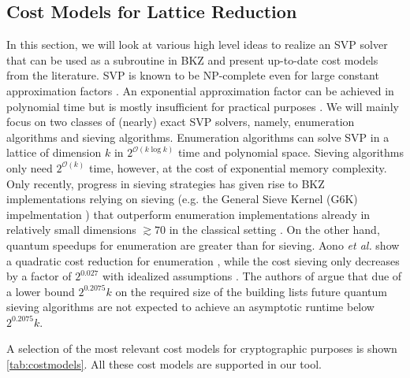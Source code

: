 




\subsection{Cost Models for Lattice Reduction} \label{sec:costmodels}
In this section, we will look at various high level ideas to realize an SVP solver that can be used as a subroutine in BKZ and present up-to-date cost models from the literature. SVP is known to be NP-complete even for large constant approximation factors \cite{Ajt98, Khot05}. An exponential approximation factor can be achieved in polynomial time but is mostly insufficient for practical purposes \cite{LLL82}.  We will mainly focus on two classes of (nearly) exact SVP solvers, namely, enumeration algorithms and sieving algorithms. Enumeration algorithms can solve SVP in a lattice of dimension $k$ in $2^{\mathcal{O}(k \log k)}$ time and polynomial space. Sieving algorithms only need $2^{\mathcal{O}(k)}$ time, however, at the cost of exponential memory complexity. Only recently, progress in sieving strategies has given rise to BKZ implementations relying on sieving (e.g. the General Sieve Kernel (G6K) impelmentation \cite{ADHKPS19, DSW21}) that outperform enumeration implementations already in relatively small dimensions $\gtrsim 70$ in the classical setting \cite{ABLR21}. On the other hand, quantum speedups for enumeration are greater than for sieving. Aono \textit{et al.} show a quadratic cost reduction for enumeration \citet{ANS18}, while the cost sieving only decreases by a factor of $2^0.027$ with idealized assumptions \cite{Laa15}. The authors of \cite{ADPS16} argue that due of a lower bound $2^0.2075k$ on the required size of the building lists future quantum sieving algorithms are not expected to achieve an asymptotic runtime below $2^0.2075k$. %

A selection of the most relevant cost models for cryptographic purposes is shown \cref{tab:costmodels}. All these cost models are supported in our tool.



